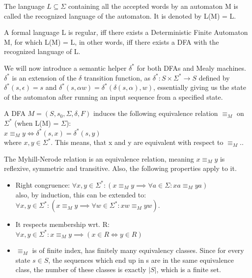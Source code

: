 \begin{definition}
	The language $L\subseteq\Sigma$ containing all the accepted words by an automaton M is called the recognized language of the automaton. It is denoted by L(M) = L.
\end{definition}

\begin{definition}
	A formal language L is regular, iff there exists a Deterministic Finite Automaton M, for which L(M) = L, in other words, iff there exists a DFA with the recognized language of L.
\end{definition}

We will now introduce a semantic helper $\delta^*$ for both DFAs and Mealy machines. $\delta^*$ is an extension of the $\delta$ transition function, as $\delta^*: S\times\Sigma^* \to S$ defined by $\delta^*(s,\epsilon) = s$ and $\delta^*(s, \alpha w) = \delta^*(\delta(s, \alpha), w)$, essentially giving us the state of the automaton after running an input sequence from a specified state.

\begin{definition} 
	A DFA $M=(S,s_{0},\Sigma,\delta,F)$ induces the following equivalence relation $\equiv_M$ on $\Sigma^*$ (when L(M) = $\Sigma$):\\
	\null\qquad$x\equiv_M y \iff \delta^*(s, x) = \delta^*(s, y)$\\
	where $x, y\in\Sigma^*$. This means, that x and y are equivalent with respect to $\equiv_M$.\cite{Kozen1977}.
\end{definition}

The Myhill-Nerode relation is an equivalence relation, meaning $x\equiv_M y$ is reflexive, symmetric and transitive. Also, the following properties apply to it\cite{Kozen1977}.


\begin{itemize}
	\item Right congruence: $\forall x, y\in\Sigma^*: (x\equiv_M y \implies 		\forall a\in\Sigma: xa\equiv_Mya)$\\ also, by induction, this can be extended to:\\
	$\forall x, y\in\Sigma^*: (x\equiv_M y \implies \forall w\in\Sigma^*: xw\equiv_Myw)$. 
	\item It respects membership wrt. R:\\
	$\forall x, y\in\Sigma^*: x\equiv_M y \implies (x\in R \iff y\in R)$
	\item $\equiv_M$ is of finite index, has finitely many equivalency classes. Since for every state $s\in S$, the sequences which end up in s are in the same equivalence class, the number of these classes is exactly $|S|$, which is a finite set.
\end{itemize}


